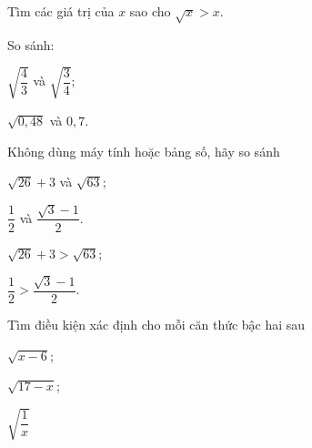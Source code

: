 \begin{bt}%
	Tìm các giá trị của $x$ sao cho $\sqrt{x}>x$.
\end{bt}
\begin{bt}
	So sánh:
	\begin{listEX}[2]
	\item $\sqrt{\dfrac{4}{3}}$ và $\sqrt{\dfrac{3}{4}}$;
	\item $\sqrt{0{,}48}$ và $0,7$.
	\end{listEX}
\end{bt}
\begin{bt}%
	Không dùng máy tính hoặc bảng số, hãy so sánh
	\begin{listEX}[2]
	\item $\sqrt{26} + 3$ và $\sqrt{63}$;
	\item $\dfrac{1}{2}$ và $\dfrac{\sqrt{3}-1}{2}$.
	\end{listEX}
	\loigiai
	{
	\begin{listEX}[2]
	\item $\sqrt{26} + 3>\sqrt{63}$;
	\item $\dfrac{1}{2}>\dfrac{\sqrt{3}-1}{2}$.
	\end{listEX}	}
\end{bt}
\begin{bt}
	Tìm điều kiện xác định cho mỗi căn thức bậc hai sau
	\begin{listEX}[3]
	\item $\sqrt{x-6}$;
	\item $\sqrt{17-x}$;
	\item $\sqrt{\dfrac{1}{x}}$
	\end{listEX}
\end{bt}
